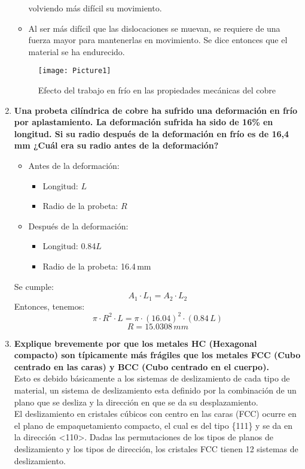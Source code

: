 \documentclass[a4paper,12pt]{report}
\begin{document}
\begin{enumerate}
\begin{itemize}
volviendo más difícil su movimiento. 
\item Al ser más difícil que las dislocaciones se muevan, se requiere de una fuerza mayor para mantenerlas en movimiento. Se dice entonces que el material se ha endurecido.
\end{itemize}
\begin{figure}
\centering
\texttt{[image: Picture1]}
\caption{Efecto del trabajo en frío en las propiedades mecánicas del cobre}
\end{figure}
\item \textbf{Una probeta  cilíndrica de cobre ha sufrido una deformación en frío por aplastamiento. La deformación sufrida ha sido de 16\% en longitud.  Si su radio después de la  deformación en frío es de  16,4 mm ¿Cuál era su radio antes de la deformación?}\\
\begin{itemize}
\item Antes de la deformación:\\
\begin{itemize}
\item Longitud: $L$
\item Radio de la probeta: $R$
\end{itemize}
\item Después de la deformación:\\
\begin{itemize}
\item Longitud: 0.84$L$
\item Radio de la probeta: 16.4$\,$mm
\end{itemize}
\end{itemize}
Se cumple:
$$
A_{1}\cdot L_{1} = A_{2}\cdot L_{2}
$$
Entonces, tenemos:
$$
\pi \cdot R^{2} \cdot L = \pi \cdot (16.04)^{2} \cdot (0.84 \,L )
$$
$$
R = 15.0308 \, mm
$$
\item \textbf{Explique brevemente por que los metales HC (Hexagonal compacto) son típicamente más frágiles que los metales FCC (Cubo centrado en las caras) y BCC (Cubo centrado en el cuerpo).}\\
Esto es debido básicamente a los sistemas de deslizamiento de cada tipo de material, un sistema de deslizamiento esta definido por la combinación de un plano que se desliza y la dirección en que se da su desplazamiento.\\
El deslizamiento en cristales cúbicos con centro en las caras (FCC) ocurre en el plano de empaquetamiento compacto, el cual es del tipo  \{111\} y se da en la dirección <110>. Dadas las permutaciones de los tipos de planos de deslizamiento y los tipos de dirección, los cristales FCC tienen 12 sistemas de deslizamiento.\\

\end{enumerate}
\end{document}
